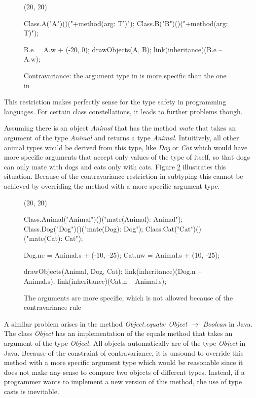 \begin{figure}[H]
	\centering
	\begin{emp}[classdiag](20, 20)

		Class.A("A")()("+method(arg: T')");
		Class.B("B")()("+method(arg: T)");

		B.e = A.w + (-20, 0);
		drawObjects(A, B);
		link(inheritance)(B.e -- A.w);

	\end{emp}
	\caption[Contravariance of argument type in \B and \A]{Contravariance: the argument type in \B is more specific than the one in \A}
	\label{fig:contravariance}
\end{figure}

This restriction makes perfectly sense for the type safety in
programming languages. For certain class constellations, it leads to
further problems though.

Assuming there is an object \emph{Animal} that has the method
\emph{mate} that takes an argument of the type \emph{Animal} and
returns a type \emph{Animal}. Intuitively, all other animal types
would be derived from this type, like \emph{Dog} or \emph{Cat} which
would have more specific arguments that accept only values of the type
of itself, so that dogs can only mate with dogs and cats only with
cats\cite{simons_theory_2003-1}. Figure \ref{fig:animalContravariance}
illustrates this situation. Because of the contravariance restriction
in subtyping this cannot be achieved by overriding the method with a
more specific argument type.

\begin{figure}[H]
	\centering
	\begin{emp}[classdiag](20, 20)

		Class.Animal("Animal")()("mate(Animal): Animal");
		Class.Dog("Dog")()("mate(Dog): Dog");
		Class.Cat("Cat")()("mate(Cat): Cat");

		Dog.ne = Animal.s + (-10, -25);
		Cat.nw = Animal.s + (10, -25);

		drawObjects(Animal, Dog, Cat);
		link(inheritance)(Dog.n -- Animal.s);
		link(inheritance)(Cat.n -- Animal.s);

	\end{emp}
	\caption[More specific arguments]{The arguments are more specific, which is not allowed because of the contravariance rule}
	\label{fig:animalContravariance}
\end{figure}

A similar problem arises in the method \emph{Object.equals: Object
$\rightarrow$ Boolean} in Java. The class \emph{Object} has an
implementation of the equals method that takes an argument of the type
\emph{Object}. All objects automatically are of the type \emph{Object}
in Java. Because of the constraint of contravariance, it is unsound
to override this method with a more specific argument type which would
be reasonable since it does not make any sense to compare two objects
of different types. Instead, if a programmer wants to implement a new
version of this method, the use of type casts is inevitable.

